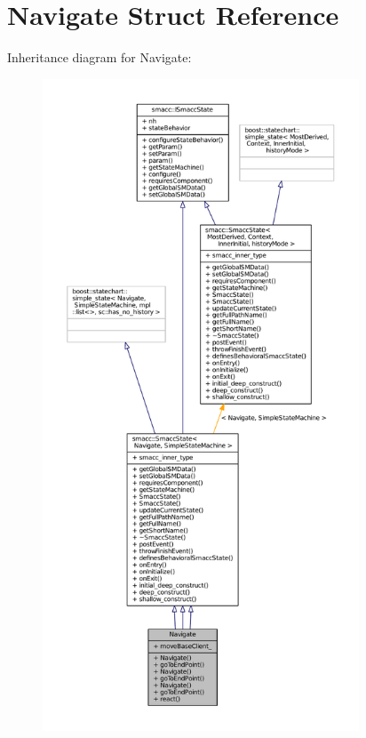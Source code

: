\hypertarget{structNavigate}{}\section{Navigate Struct Reference}
\label{structNavigate}


Inheritance diagram for Navigate\+:
\nopagebreak
\begin{figure}[H]
\begin{center}
\leavevmode
\includegraphics[height=550pt]{structNavigate__inherit__graph}
\end{center}
\end{figure}


